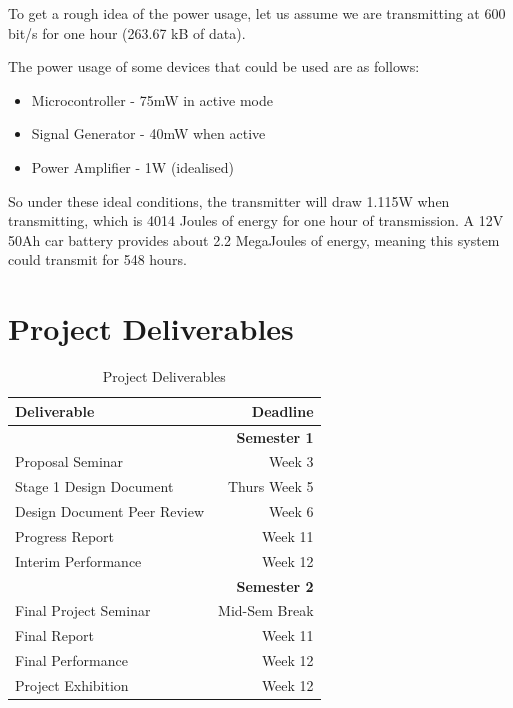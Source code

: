 \documentclass[a4paper,12pt]{article}
\begin{document}
\begin{appendices}
To get a rough idea of the power usage, let us assume we are transmitting at 600 bit/s for one hour (263.67 kB of data).

The power usage of some devices that could be used are as follows:
\begin{itemize}
\item Microcontroller - 75mW in active mode \citep{ref:atmega}
\item Signal Generator - 40mW when active \citep{ref:ad9834}
\item Power Amplifier - 1W (idealised)
\end{itemize}
So under these ideal conditions, the transmitter will draw 1.115W when transmitting, which is 4014 Joules of energy for one hour of transmission. A 12V 50Ah car battery provides about 2.2 MegaJoules of energy, meaning this system could transmit for 548 hours.

\section{Project Deliverables}
\begin{table}[h!]
\begin{center}
\begin{tabular}{l|r}
\textbf{Deliverable} & \textbf{Deadline}\\
\hline
& \textbf{Semester 1}\\
Proposal Seminar & Week 3\\
Stage 1 Design Document & Thurs Week 5\\
Design Document Peer Review & Week 6\\
Progress Report & Week 11\\
Interim Performance & Week 12\\
& \textbf{Semester 2}\\
Final Project Seminar & Mid-Sem Break\\
Final Report & Week 11\\
Final Performance & Week 12\\
Project Exhibition & Week 12\\
\end{tabular}
\caption{Project Deliverables}
\label{deliverables}
\end{center}
\end{table}

\end{appendices}
\end{document}

